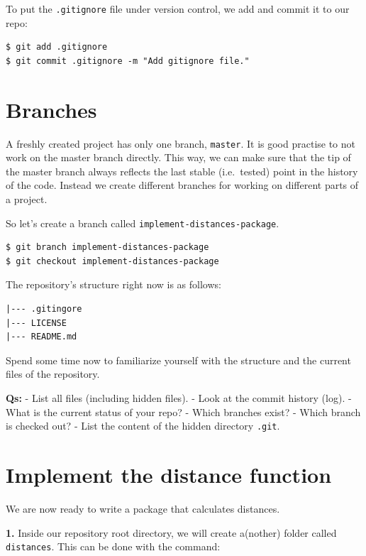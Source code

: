 \documentclass[11pt]{article}
\begin{document}
    To put the \texttt{.gitignore} file under version control, we add and
commit it to our repo:

\begin{verbatim}
$ git add .gitignore
$ git commit .gitignore -m "Add gitignore file."
\end{verbatim}

    \hypertarget{branches}{%
\section{Branches}\label{branches}}

A freshly created project has only one branch, \texttt{master}. It is
good practise to not work on the master branch directly. This way, we
can make sure that the tip of the master branch always reflects the last
stable (i.e.~tested) point in the history of the code. Instead we create
different branches for working on different parts of a project.

So let's create a branch called \texttt{implement-distances-package}.

\begin{verbatim}
$ git branch implement-distances-package
$ git checkout implement-distances-package
\end{verbatim}

    The repository's structure right now is as follows:

\begin{verbatim}
|--- .gitingore
|--- LICENSE   
|--- README.md
\end{verbatim}

Spend some time now to familiarize yourself with the structure and the
current files of the repository.

\textbf{Qs:} - List all files (including hidden files). - Look at the
commit history (log). - What is the current status of your repo? - Which
branches exist? - Which branch is checked out? - List the content of the
hidden directory \texttt{.git}.

    \hypertarget{implement-the-distance-function}{%
\section{Implement the distance
function}\label{implement-the-distance-function}}

We are now ready to write a package that calculates distances.

\textbf{1.} Inside our repository root directory, we will create
a(nother) folder called \texttt{distances}. This can be done with the
command:
\end{document}
